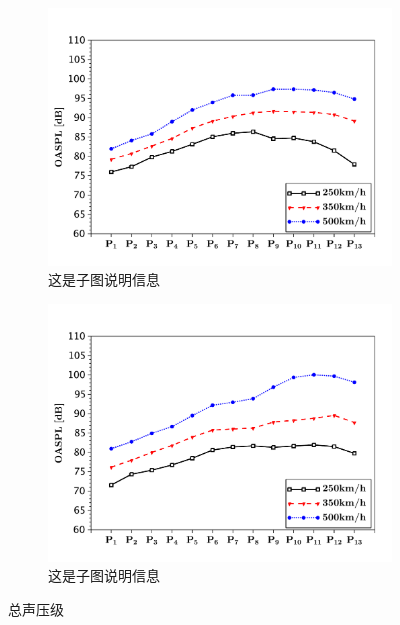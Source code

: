 \begin{figure}[H]
    
    \begin{subfigure}{.4\textwidth}
        \centering
        \includegraphics[width=\textwidth]{img/oaspl_c.pdf}
        \caption{{\songti{}这是子图说明信息}}
    \end{subfigure}
    \quad
    \begin{subfigure}{.4\textwidth}
        \centering
        \includegraphics[width=\textwidth]{img/oaspl_d.pdf}
        \caption{{\songti{}这是子图说明信息}}
    \end{subfigure}
    \caption{总声压级}
    \label{fig:fourimg}
\end{figure}

